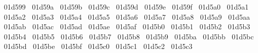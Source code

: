 {  ^^^^^^01d599%
  ^^^^^^01d59a%
  ^^^^^^01d59b%
  ^^^^^^01d59c%
  ^^^^^^01d59d%
  ^^^^^^01d59e%
  ^^^^^^01d59f%
  ^^^^^^01d5a0%
  ^^^^^^01d5a1%
  ^^^^^^01d5a2%
  ^^^^^^01d5a3%
  ^^^^^^01d5a4%
  ^^^^^^01d5a5%
  ^^^^^^01d5a6%
  ^^^^^^01d5a7%
  ^^^^^^01d5a8%
  ^^^^^^01d5a9%
  ^^^^^^01d5aa%
  ^^^^^^01d5ab%
  ^^^^^^01d5ac%
  ^^^^^^01d5ad%
  ^^^^^^01d5ae%
  ^^^^^^01d5af%
  ^^^^^^01d5b0%
  ^^^^^^01d5b1%
  ^^^^^^01d5b2%
  ^^^^^^01d5b3%
  ^^^^^^01d5b4%
  ^^^^^^01d5b5%
  ^^^^^^01d5b6%
  ^^^^^^01d5b7%
  ^^^^^^01d5b8%
  ^^^^^^01d5b9%
  ^^^^^^01d5ba%
  ^^^^^^01d5bb%
  ^^^^^^01d5bc%
  ^^^^^^01d5bd%
  ^^^^^^01d5be%
  ^^^^^^01d5bf%
  ^^^^^^01d5c0%
  ^^^^^^01d5c1%
  ^^^^^^01d5c2%
  ^^^^^^01d5c3%
}
